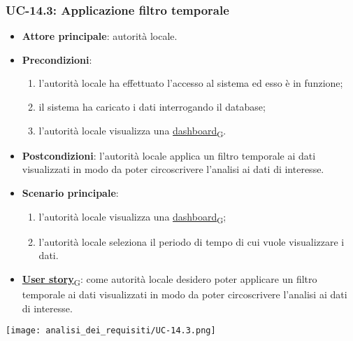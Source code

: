 \newpage

\subsubsection{UC-14.3: Applicazione filtro temporale}
\begin{itemize}
	\item \textbf{Attore principale}: autorità locale.
	\item \textbf{Precondizioni}:
	      \begin{enumerate}
		      \item l'autorità locale ha effettuato l'accesso al sistema ed esso è in funzione;
		      \item il sistema ha caricato i dati interrogando il database;
		      \item l'autorità locale visualizza una \href{https://7last.github.io/docs/rtb/documentazione-interna/glossario\#dashboard}{dashboard\textsubscript{G}}.
	      \end{enumerate}
	\item \textbf{Postcondizioni}: l'autorità locale applica un filtro temporale ai dati visualizzati in modo da poter circoscrivere l'analisi ai dati di interesse.
	\item \textbf{Scenario principale}:
	      \begin{enumerate}
		      \item l'autorità locale visualizza una \href{https://7last.github.io/docs/rtb/documentazione-interna/glossario\#dashboard}{dashboard\textsubscript{G}};
		      \item l'autorità locale seleziona il periodo di tempo di cui vuole visualizzare i dati.
	      \end{enumerate}
	\item \href{https://7last.github.io/docs/rtb/documentazione-interna/glossario\#user-story}{\textbf{User story}\textsubscript{G}}:
	      come autorità locale desidero poter applicare un filtro temporale ai dati visualizzati in modo da poter circoscrivere l'analisi ai dati di interesse.
\end{itemize}
\begin{center}
	\texttt{[image: analisi\_dei\_requisiti/UC-14.3.png]}
\end{center}

\newpage

